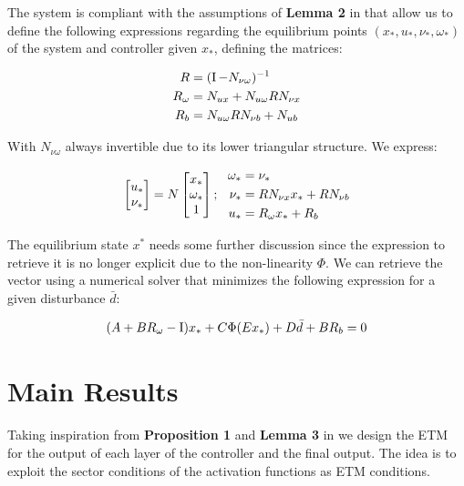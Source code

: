 \documentclass{article}
\begin{document}
The system is compliant with the assumptions of \textbf{Lemma 2} in \cite{css-extended} that allow us to define the following expressions regarding the equilibrium points $\left( x_*, u_*, \nu_*, \omega_* \right)$ of the system and controller given $x_*$, defining the matrices:

\begin{equation}
    \begin{aligned}
         R &= (\operatorname{I} - N_{\nu \omega})^{-1}\\
         R_{\omega} &= N_{u x} + N_{u \omega} R N_{\nu x}\\
         R_b &= N_{u \omega} R N_{\nu b} + N_{u b}
    \end{aligned}
\end{equation}

With $N_{\nu \omega}$ always invertible due to its lower triangular structure. We express:

\begin{equation}
  \left[\begin{matrix}u_* \\ \nu_*\end{matrix}\right] = N \left[\begin{matrix}x_* \\ \omega_* \\ 1\end{matrix}\right]; \ \  
  \begin{aligned}
    \omega_* &= \nu_*\\
    \nu_* &= R N_{\nu x} x_* + R N_{\nu b}\\
    u_* &= R_{\omega} x_* + R_b
  \end{aligned}
\end{equation}

The equilibrium state $x^*$ needs some further discussion since the expression to retrieve it is no longer explicit due to the non-linearity $\Phi$. We can retrieve the vector using a numerical solver that minimizes the following expression for a given disturbance $\bar{d}$: 

\begin{equation}
  (A + B R_{\omega} - \operatorname{I}) x_* + C \Phi(E x_*) + D \bar{d} + B R_b = 0
\end{equation}

\section{Main Results}
Taking inspiration from \textbf{Proposition 1} and \textbf{Lemma 3} in \cite{css-extended} we design the ETM for the output of each layer of the controller and the final output. The idea is to exploit the sector conditions of the activation functions as ETM conditions. 
\end{document}
